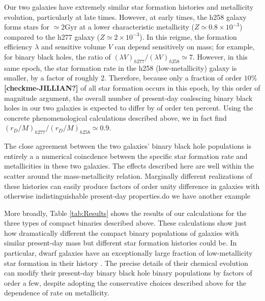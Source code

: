 \documentclass[nofootinbib,twocolumn,prd]{emulateapj}
\newcommand\editremark[1]{{\color{red}#1}}
\newcommand\unit[1]{\text{#1}}
\newcommand\ExcitingGalaxy{h258}
\newcommand\BoringGalaxy{h277}
\begin{document}
 Our two galaxies have extremely similar star formation histories and metallicity evolution, particularly at late
 times.  
However, at early times, the \ExcitingGalaxy{} galaxy forms stars for $\simeq 2\unit{Gyr}$ at a lower characteristic metallicity
($Z\simeq 0.8 \times10^{-3}$) compared
to the \BoringGalaxy{} galaxy ($Z\simeq 2\times 10^{-3}$).  In this reigme, the formation efficiency $\lambda$ and sensitive volume $V$
can depend sensitively on mass; for example, for binary black holes, the ratio of  $(\lambda V)_{\BoringGalaxy{}}/(\lambda
V)_{\ExcitingGalaxy{}} \simeq 7$.    However, in this same epoch, the star formation rate in the \ExcitingGalaxy{} (low-metallicity)
galaxy is smaller, by a factor of roughly 2.
Therefore, because only a fraction of order $10\%$ \textbf{[checkme-JILLIAN?]} of all star formation occurs in this epoch, by this order of magnitude
argument, the overall number of
present-day coalescing binary black holes in our two galaxies is expected to differ by of order ten percent.
%
Using the concrete phenomenological calculations described above, we in fact find
$(r_{D}/M)_{\BoringGalaxy{}}/(r_{D}/M)_{\ExcitingGalaxy{}}\simeq 0.9$.    

The close agreement between the two galaxies' binary black hole populations  is entirely a
a numerical coincdence between the specific star formation rate and metallicities in these two galaxies.  The effects described here
  are well within the scatter around the mass-metallicity relation.  Marginally different realizations of these
  histories can easily produce factors of order unity difference in galaxies with otherwise indistinguishable
  present-day properties.\editremark{do we have another example}

More broadly, Table \ref{tab:Results} shows the results of our calculations for the three types of compact binaries
described above.   These calculations show just how dramatically different the compact binary populations of galaxies
with similar present-day mass but different star formation histories could be.   In particular, dwarf galaxies have an
exceptionally large fraction of low-metallicity star formation in their history \citep{Kirby13}.  The precise details of their chemical
evolution can modify their present-day binary black hole binary populations by factors of order a few, despite  adopting
the conservative choices described above for the dependence of rate on metallicity.  
\end{document}

